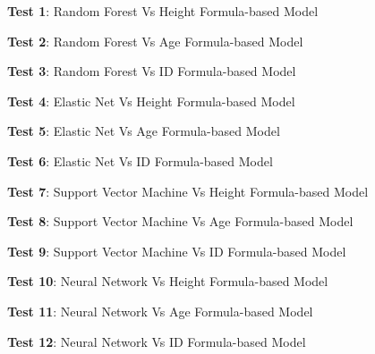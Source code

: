 \documentclass[11pt]{article}
\begin{document}
\begin{table}[h]
\caption{Paired t-test results between each ML model and formula-based model}
\label{table:t_test_ml_formula}
\begin{threeparttable}
\renewcommand{\TPTminimum}{\linewidth}
\begin{tablenotes}
\footnotesize
\item \textbf{Test 1}: Random Forest Vs Height Formula-based Model
\item \textbf{Test 2}: Random Forest Vs Age Formula-based Model
\item \textbf{Test 3}: Random Forest Vs ID Formula-based Model
\item \textbf{Test 4}: Elastic Net Vs Height Formula-based Model
\item \textbf{Test 5}: Elastic Net Vs Age Formula-based Model
\item \textbf{Test 6}: Elastic Net Vs ID Formula-based Model
\item \textbf{Test 7}: Support Vector Machine Vs Height Formula-based Model
\item \textbf{Test 8}: Support Vector Machine Vs Age Formula-based Model
\item \textbf{Test 9}: Support Vector Machine Vs ID Formula-based Model
\item \textbf{Test 10}: Neural Network Vs Height Formula-based Model
\item \textbf{Test 11}: Neural Network Vs Age Formula-based Model
\item \textbf{Test 12}: Neural Network Vs ID Formula-based Model
\end{tablenotes}
\end{threeparttable}
\end{table}
\end{document}
